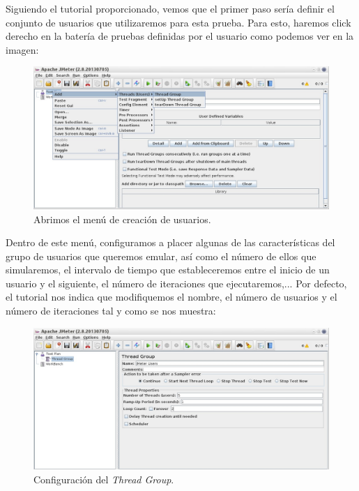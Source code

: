 \documentclass[paper=a4, fontsize=11pt]{scrartcl} %
\numberwithin{equation}{section} %
\numberwithin{figure}{section} %
\numberwithin{table}{section} %
\begin{document}
\begin{enumerate}
		Siguiendo el tutorial proporcionado, vemos que el primer paso sería definir el conjunto de
		usuarios que utilizaremos para esta prueba. Para esto, haremos click derecho en la batería de
		pruebas definidas por el usuario como podemos ver en la imagen:
		
		\begin{figure}[H]
			\centering
			\includegraphics[width=15cm]{Ejercicio_7a.jpg}
			\caption{Abrimos el menú de creación de usuarios.}
			\label{fig:user_menu}
		\end{figure}
		
		Dentro de este menú, configuramos a placer algunas de las características del grupo de usuarios
		que queremos emular, así como el número de ellos que simularemos, el intervalo de tiempo que
		estableceremos entre el inicio de un usuario y el siguiente, el número de iteraciones que
		ejecutaremos,... Por defecto, el tutorial nos indica que modifiquemos el nombre, el número de
		usuarios y el número de iteraciones tal y como se nos muestra:
		
		\begin{figure}[H]
			\centering
			\includegraphics[width=15cm]{Ejercicio_7b.jpg}
			\caption{Configuración del \textit{Thread Group}.}
			\label{fig:user_config}
		\end{figure}
		

\end{enumerate}
\end{document}
